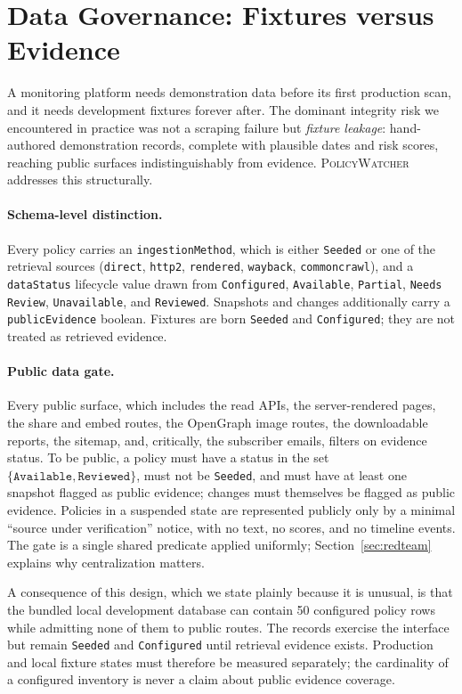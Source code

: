 \documentclass[11pt]{article}
\newcommand{\pw}{\textsc{PolicyWatcher}}
\begin{document}
\section{Data Governance: Fixtures versus Evidence}
\label{sec:governance}

A monitoring platform needs demonstration data before its first production scan,
and it needs development fixtures forever after. The dominant integrity risk we
encountered in practice was not a scraping failure but \emph{fixture leakage}:
hand-authored demonstration records, complete with plausible dates and risk
scores, reaching public surfaces indistinguishably from evidence. \pw{} addresses
this structurally.

\paragraph{Schema-level distinction.}
Every policy carries an \texttt{ingestionMethod}, which is either \texttt{Seeded}
or one of the retrieval sources (\texttt{direct}, \texttt{http2},
\texttt{rendered}, \texttt{wayback}, \texttt{commoncrawl}), and a
\texttt{dataStatus} lifecycle value drawn from \texttt{Configured},
\texttt{Available}, \texttt{Partial}, \texttt{Needs Review}, \texttt{Unavailable},
and \texttt{Reviewed}. Snapshots and changes additionally carry a
\texttt{publicEvidence} boolean. Fixtures are born \texttt{Seeded} and
\texttt{Configured}; they are not treated as retrieved evidence.

\paragraph{Public data gate.}
Every public surface, which includes the read APIs, the server-rendered pages,
the share and embed routes, the OpenGraph image routes, the downloadable
reports, the sitemap, and, critically, the subscriber emails, filters on
evidence status. To be public, a policy must have a status in the set
$\{\texttt{Available}, \texttt{Reviewed}\}$, must not be \texttt{Seeded}, and
must have at least one snapshot flagged as public evidence; changes must
themselves be flagged as public evidence. Policies in a suspended state are
represented publicly only by a minimal ``source under verification'' notice, with
no text, no scores, and no timeline events. The gate is a single shared predicate
applied uniformly; Section~\ref{sec:redteam} explains why centralization matters.

A consequence of this design, which we state plainly because it is unusual, is
that the bundled local development database can contain 50 configured policy
rows while admitting none of them to public routes. The records exercise the
interface but remain \texttt{Seeded} and \texttt{Configured} until retrieval
evidence exists. Production and local fixture states must therefore be measured
separately; the cardinality of a configured inventory is never a claim about
public evidence coverage.
\end{document}
